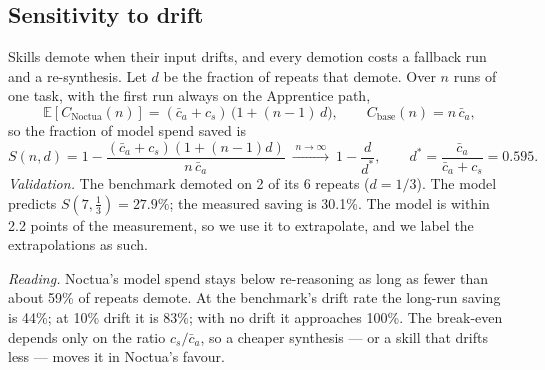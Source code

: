 \documentclass[11pt]{article}
\begin{document}
\subsection{Sensitivity to drift}\label{sec:drift}

Skills demote when their input drifts, and every demotion costs a fallback run and a re-synthesis. Let $d$ be the
fraction of repeats that demote. Over $n$ runs of one task, with the first run always on the Apprentice path,
\begin{equation}
\mathbb{E}[C_\text{Noctua}(n)]=(\bar c_a+c_s)\,\bigl(1+(n-1)\,d\bigr),\qquad C_\text{base}(n)=n\,\bar c_a,
\end{equation}
so the fraction of model spend saved is
\begin{equation}
S(n,d)=1-\frac{(\bar c_a+c_s)(1+(n-1)d)}{n\,\bar c_a}\ \xrightarrow{\;n\to\infty\;}\ 1-\frac{d}{d^\ast},
\qquad d^\ast=\frac{\bar c_a}{\bar c_a+c_s}=0.595 .
\end{equation}
\emph{Validation.} The benchmark demoted on 2 of its 6 repeats ($d=1/3$). The model predicts
$S(7,\tfrac13)=27.9\%$; the measured saving is 30.1\%. The model is within 2.2 points of the measurement, so we use it
to extrapolate, and we label the extrapolations as such.

\emph{Reading.} Noctua's model spend stays below re-reasoning as long as fewer than about 59\% of repeats demote. At
the benchmark's drift rate the long-run saving is 44\%; at 10\% drift it is 83\%; with no drift it approaches 100\%.
The break-even depends only on the ratio $c_s/\bar c_a$, so a cheaper synthesis --- or a skill that drifts less ---
moves it in Noctua's favour.
\end{document}
